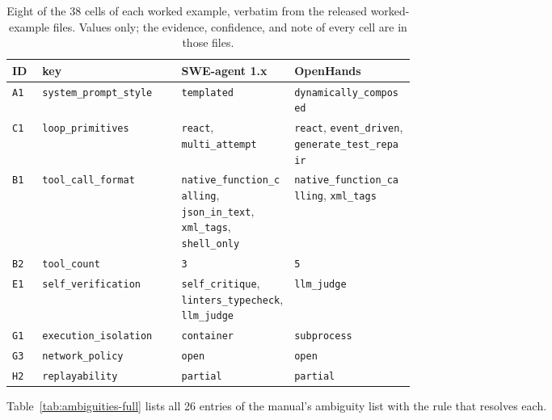 \begin{table}[htbp]
\caption{Eight of the 38 cells of each worked example, verbatim from the released worked-example
files. Values only; the evidence, confidence, and note of every cell are in those files.}
\label{tab:coding-examples}
\footnotesize
\begin{tabular}{@{}l l p{0.28\linewidth} p{0.30\linewidth}@{}}
\toprule
ID & key & SWE-agent 1.x & OpenHands \tabularnewline
\midrule
\texttt{A1} & \texttt{system\_prompt\_style} & \raggedright \texttt{templated} & \raggedright \texttt{dynamically\_composed} \tabularnewline
\texttt{C1} & \texttt{loop\_primitives} & \raggedright \texttt{react}, \texttt{multi\_attempt} & \raggedright \texttt{react}, \texttt{event\_driven}, \texttt{generate\_test\_repair} \tabularnewline
\texttt{B1} & \texttt{tool\_call\_format} & \raggedright \texttt{native\_function\_calling}, \texttt{json\_in\_text}, \texttt{xml\_tags}, \texttt{shell\_only} & \raggedright \texttt{native\_function\_calling}, \texttt{xml\_tags} \tabularnewline
\texttt{B2} & \texttt{tool\_count} & \raggedright \texttt{3} & \raggedright \texttt{5} \tabularnewline
\texttt{E1} & \texttt{self\_verification} & \raggedright \texttt{self\_critique}, \texttt{linters\_typecheck}, \texttt{llm\_judge} & \raggedright \texttt{llm\_judge} \tabularnewline
\texttt{G1} & \texttt{execution\_isolation} & \raggedright \texttt{container} & \raggedright \texttt{subprocess} \tabularnewline
\texttt{G3} & \texttt{network\_policy} & \raggedright \texttt{open} & \raggedright \texttt{open} \tabularnewline
\texttt{H2} & \texttt{replayability} & \raggedright \texttt{partial} & \raggedright \texttt{partial} \tabularnewline
\bottomrule
\end{tabular}
\end{table}

Table~\ref{tab:ambiguities-full} lists all 26 entries of the manual's ambiguity list with the rule
that resolves each.

